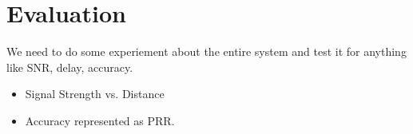 \section{Evaluation}
\label{sec:evaluation}

We need to do some experiement about the entire system and test it for anything like SNR, delay, accuracy.
\begin{itemize}
\item Signal Strength vs. Distance
\item Accuracy represented as PRR.

\end{itemize}



